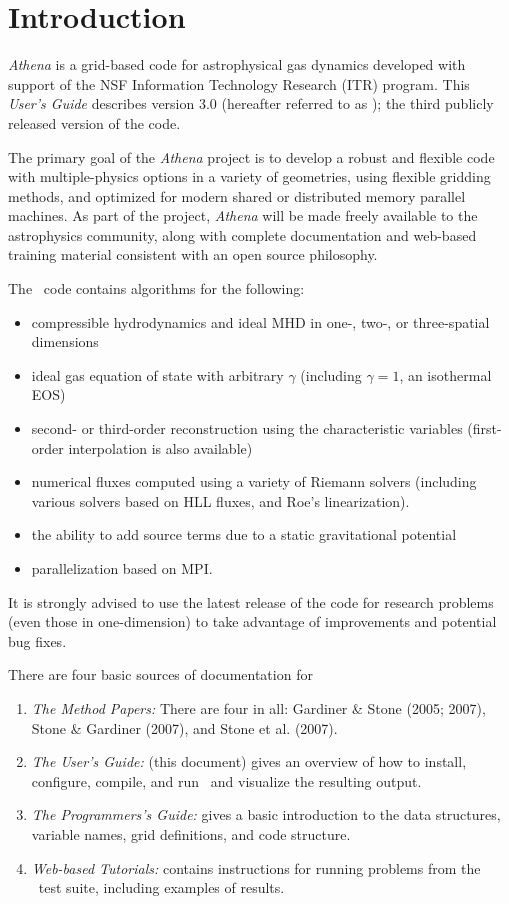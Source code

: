 \section{Introduction}

{\it Athena} is a grid-based code for astrophysical gas dynamics
developed with support of the NSF Information Technology Research (ITR)
program.  This {\it User's Guide} describes version 3.0 (hereafter
referred to as \ath); the third publicly released version of the code.

The primary goal of the {\it Athena} project is to develop a robust and
flexible code with multiple-physics options in a variety of geometries,
using flexible gridding methods, and optimized for modern shared or
distributed memory parallel machines.  As part of the project, {\it Athena}
will be made freely available to the astrophysics community, along with
complete documentation and web-based training material consistent with
an open source philosophy.

The \ath\ code contains algorithms for
the following:
\begin{itemize}
\item compressible hydrodynamics and ideal MHD in one-, two-, or three-spatial dimensions
\item ideal gas equation of state with arbitrary $\gamma$ (including 
$\gamma = 1$, an isothermal EOS)
\item second- or third-order reconstruction using the characteristic variables
(first-order interpolation is also available)
\item numerical fluxes computed using a variety of Riemann solvers (including
various solvers based on HLL fluxes, and Roe's linearization).
\item the ability to add source terms due to a static gravitational potential
\item parallelization based on MPI.
\end{itemize}
It is strongly advised to use the latest release of
the code for research problems (even those in one-dimension) to take
advantage of improvements and potential bug fixes.

There are four basic sources of documentation for \ath
\begin{enumerate}
\item {\it The Method Papers:} There are four in all: Gardiner \& Stone
(2005; 2007), Stone \& Gardiner (2007), and Stone et al. (2007).
\item {\it The User's Guide:} (this document) gives an overview of how to
install, configure, compile, and run \ath\ and visualize the resulting output.
\item {\it The Programmers's Guide:} gives a basic introduction to the 
data structures, variable names, grid definitions, and code structure.
\item {\it Web-based Tutorials:} contains instructions
for running problems from the \ath\ test suite, including examples of results.
\end{enumerate}

